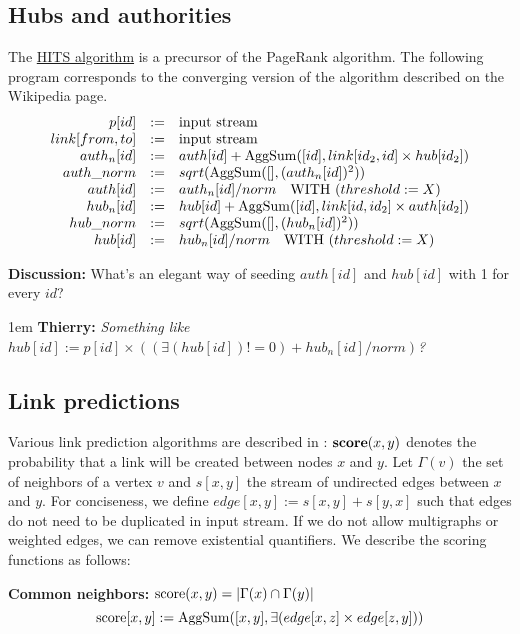\documentclass[10pt]{article}
\newlength{\dlen}
\def\discuss#1{\par\hspace{2em}
\setlength{\dlen}{\textwidth}
\addtolength{\dlen}{-2em}
\begin{minipage}{\dlen}\footnotesize {\bf\color{red} Discussion:} #1\end{minipage}\par}
\def\say#1#2{\begingroup\par\leftskip1em {\bf #1:} \it #2\par\endgroup}
\begin{document}
\subsection{Hubs and authorities}
The \href{http://en.wikipedia.org/wiki/HITS_algorithm}{HITS algorithm} is a precursor of the PageRank algorithm.
The following program corresponds to the converging version of the algorithm described on the Wikipedia page.
\[\begin{array}{rcl}
p[id] &:=& \text{input stream} \\
link[from,to] &:=& \text{input stream} \\
auth_n[id] &:=& auth[id] + {\rm AggSum}([id], link[id_2,id] \times hub[id_2]) \\
auth\_norm &:=& sqrt({\rm AggSum}([], (auth_n[id])^2)) \\
auth[id] &:=& auth_n[id] / norm \quad\text{WITH } (threshold := X)\\
hub_n[id] &:=& hub[id] + {\rm AggSum}([id], link[id,id_2] \times auth[id_2]) \\
hub\_norm &:=& sqrt({\rm AggSum}([], (hub_n[id])^2)) \\
hub[id] &:=& hub_n[id] / norm \quad\text{WITH } (threshold := X)\\
\end{array}\]
\discuss{What's an elegant way of seeding $auth[id]$ and $hub[id]$ with 1 for every $id$?
\say{Thierry}{Something like $hub[id] := p[id] \times ((\exists(hub[id])!=0) + hub_n[id] / norm)$?}
} 

\subsection{Link predictions}
Various link prediction algorithms are described in \cite{linkpred}: ${\bf score}(x,y)$ denotes the probability that a link will be created between nodes $x$ and $y$. Let $\Gamma(v)$ the set of neighbors of a vertex $v$ and $s[x,y]$ the stream of undirected edges between $x$ and $y$. For conciseness, we define $edge[x,y] := s[x,y]+s[y,x]$ such that edges do not need to be duplicated in input stream. If we do not allow multigraphs or weighted edges, we can remove existential quantifiers. We describe the scoring functions as follows:

{\bf Common neighbors:} ${\rm score}(x,y)=|\Gamma(x) \cap \Gamma(y)|$
\[{\rm score}[x,y] := {\rm AggSum}([x,y], \exists(edge[x,z] \times edge[z,y]))\]
\end{document}
